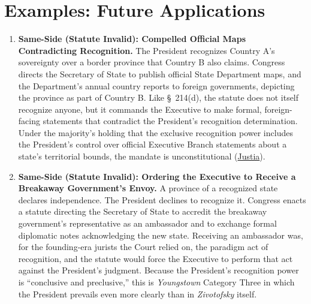 \documentclass[12pt]{article}
\begin{document}
\section{Examples: Future Applications}
\begin{enumerate}

\item \textbf{Same-Side (Statute Invalid): Compelled Official Maps Contradicting Recognition.} The President recognizes Country A's sovereignty over a border province that Country B also claims. Congress directs the Secretary of State to publish official State Department maps, and the Department's annual country reports to foreign governments, depicting the province as part of Country B. Like \S~214(d), the statute does not itself recognize anyone, but it commands the Executive to make formal, foreign-facing statements that contradict the President's recognition determination. Under the majority's holding that the exclusive recognition power includes the President's control over official Executive Branch statements about a state's territorial bounds, the mandate is unconstitutional (\href{https://supreme.justia.com/cases/federal/us/576/1/}{Justia}).

\item \textbf{Same-Side (Statute Invalid): Ordering the Executive to Receive a Breakaway Government's Envoy.} A province of a recognized state declares independence. The President declines to recognize it. Congress enacts a statute directing the Secretary of State to accredit the breakaway government's representative as an ambassador and to exchange formal diplomatic notes acknowledging the new state. Receiving an ambassador was, for the founding-era jurists the Court relied on, the paradigm act of recognition, and the statute would force the Executive to perform that act against the President's judgment. Because the President's recognition power is ``conclusive and preclusive,'' this is \textit{Youngstown} Category Three in which the President prevails even more clearly than in \textit{Zivotofsky} itself.


\end{enumerate}
\end{document}
